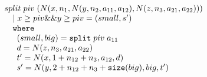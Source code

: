 $$
\begin{array}{l}
split \; piv \; (N (x,n_1,N (y,n_2,a_{11},a_{12}), N (z,n_3,a_{21},a_{22})))\\
\hspace{1em}	| \; x \geq piv \&\& y \geq piv = (small,s')\\
\hspace{1em} 	\texttt{where}\\
\hspace{1.5em}    (small,big) = \texttt{split} \; piv \; a_{11}\\
\hspace{1.5em}	  d = N (z,n_3,a_{21},a_{22})\\
\hspace{1.5em}    t' = N (x,1+n_{12}+n_3,a_{12},d)\\
\hspace{1.5em}	  s' = N (y,2+n_{12}+n_3+\texttt{size}(big),big,t')
\end{array}
$$